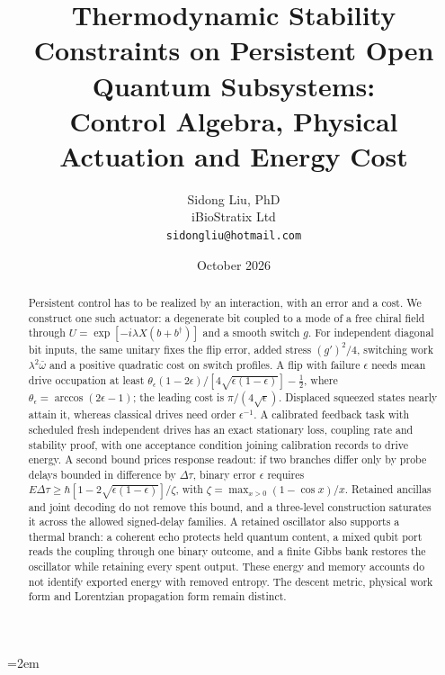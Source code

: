 \documentclass[aps,pre,onecolumn,superscriptaddress,floatfix,longbibliography]{revtex4-2}
\begin{document}
\emergencystretch=2em
\raggedbottom

\title{Thermodynamic Stability Constraints on Persistent Open Quantum Subsystems:\texorpdfstring{\\}{ }
Control Algebra, Physical Actuation and Energy Cost}

\author{Sidong Liu, PhD \\
\small iBioStratix Ltd \\
\small \texttt{sidongliu@hotmail.com}}

\date{October 2026}

\begin{abstract}
Persistent control has to be realized by an interaction, with an error and a cost. We construct one such actuator: a degenerate bit coupled to a mode of a free chiral field through $U=\exp[-i\lambda X(b+b^\dagger)]$ and a smooth switch $g$. For independent diagonal bit inputs, the same unitary fixes the flip error, added stress $(g')^2/4$, switching work $\lambda^2\bar\omega$ and a positive quadratic cost on switch profiles. A flip with failure $\epsilon$ needs mean drive occupation at least $\theta_\epsilon(1-2\epsilon)/[4\sqrt{\epsilon(1-\epsilon)}]-\tfrac12$, where $\theta_\epsilon=\arccos(2\epsilon-1)$; the leading cost is $\pi/(4\sqrt\epsilon)$. Displaced squeezed states nearly attain it, whereas classical drives need order $\epsilon^{-1}$. A calibrated feedback task with scheduled fresh independent drives has an exact stationary loss, coupling rate and stability proof, with one acceptance condition joining calibration records to drive energy. A second bound prices response readout: if two branches differ only by probe delays bounded in difference by $\Delta\tau$, binary error $\epsilon$ requires $E\Delta\tau\ge\hbar[1-2\sqrt{\epsilon(1-\epsilon)}]/\zeta$, with $\zeta=\max_{x>0}(1-\cos x)/x$. Retained ancillas and joint decoding do not remove this bound, and a three-level construction saturates it across the allowed signed-delay families. A retained oscillator also supports a thermal branch: a coherent echo protects held quantum content, a mixed qubit port reads the coupling through one binary outcome, and a finite Gibbs bank restores the oscillator while retaining every spent output. These energy and memory accounts do not identify exported energy with removed entropy. The descent metric, physical work form and Lorentzian propagation form remain distinct.
\end{abstract}

\maketitle
\end{document}
